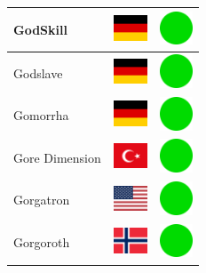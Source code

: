 \documentclass[12pt, a4paper, twoside]{report}
\begin{document}
\begin{center}
\begin{longtable}{|p{5cm}|p{2cm}|p{2cm}|}
 GodSkill                                                   & \includegraphics[width=1cm]{../img/flags/de} &   \includegraphics[width=1cm]{../likes/y} \\ \hline
 Godslave                                                   & \includegraphics[width=1cm]{../img/flags/de} &   \includegraphics[width=1cm]{../likes/y} \\ \hline
 Gomorrha                                                   & \includegraphics[width=1cm]{../img/flags/de} &   \includegraphics[width=1cm]{../likes/y} \\ \hline
 Gore Dimension                                             & \includegraphics[width=1cm]{../img/flags/tr} &   \includegraphics[width=1cm]{../likes/y} \\ \hline
 Gorgatron                                                  & \includegraphics[width=1cm]{../img/flags/us} &   \includegraphics[width=1cm]{../likes/y} \\ \hline
 Gorgoroth                                                  & \includegraphics[width=1cm]{../img/flags/no} &   \includegraphics[width=1cm]{../likes/y} \\ \hline

\end{longtable}
\end{center}
\end{document}
